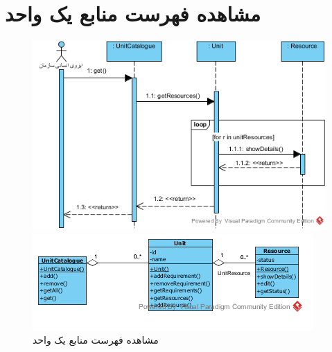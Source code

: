 \section{مشاهده فهرست منابع یک واحد}
\begin{figure}[H]
	\centering
	\includegraphics[scale=0.6]{img/sequence-analysis/ViewListOfResources}
	
	
	\includegraphics[scale=0.6]{img/sequence-analysis/ViewListOfResourcesC}
	\caption{مشاهده فهرست منابع یک واحد}
\end{figure}

